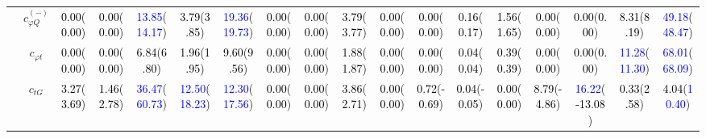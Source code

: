 \documentclass{article}
\begin{document}
\begin{landscape}
\begin{table}[H]
\begin{tabular}{|c|c|c|c|c|c|c|c|c|c|c|c|c|c|c|c|c|c|}
 & $c_{\varphi Q}^{(-)}$ & \textcolor{black}{0.00}(\textcolor{black}{0.00}) & \textcolor{black}{0.00}(\textcolor{black}{0.00}) & \textcolor{blue}{13.85}(\textcolor{blue}{14.17}) & \textcolor{black}{3.79}(\textcolor{black}{3.85}) & \textcolor{blue}{19.36}(\textcolor{blue}{19.73}) & \textcolor{black}{0.00}(\textcolor{black}{0.00}) & \textcolor{black}{0.00}(\textcolor{black}{0.00}) & \textcolor{black}{3.79}(\textcolor{black}{3.77}) & \textcolor{black}{0.00}(\textcolor{black}{0.00}) & \textcolor{black}{0.00}(\textcolor{black}{0.00}) & \textcolor{black}{0.16}(\textcolor{black}{0.17}) & \textcolor{black}{1.56}(\textcolor{black}{1.65}) & \textcolor{black}{0.00}(\textcolor{black}{0.00}) & \textcolor{black}{0.00}(\textcolor{black}{0.00}) & \textcolor{black}{8.31}(\textcolor{black}{8.19}) & \textcolor{blue}{49.18}(\textcolor{blue}{48.47})\\ \cline{2-18}
 & $c_{\varphi t}$ & \textcolor{black}{0.00}(\textcolor{black}{0.00}) & \textcolor{black}{0.00}(\textcolor{black}{0.00}) & \textcolor{black}{6.84}(\textcolor{black}{6.80}) & \textcolor{black}{1.96}(\textcolor{black}{1.95}) & \textcolor{black}{9.60}(\textcolor{black}{9.56}) & \textcolor{black}{0.00}(\textcolor{black}{0.00}) & \textcolor{black}{0.00}(\textcolor{black}{0.00}) & \textcolor{black}{1.88}(\textcolor{black}{1.87}) & \textcolor{black}{0.00}(\textcolor{black}{0.00}) & \textcolor{black}{0.00}(\textcolor{black}{0.00}) & \textcolor{black}{0.04}(\textcolor{black}{0.04}) & \textcolor{black}{0.39}(\textcolor{black}{0.39}) & \textcolor{black}{0.00}(\textcolor{black}{0.00}) & \textcolor{black}{0.00}(\textcolor{black}{0.00}) & \textcolor{blue}{11.28}(\textcolor{blue}{11.30}) & \textcolor{blue}{68.01}(\textcolor{blue}{68.09})\\ \cline{2-18}
 & $c_{tG}$ & \textcolor{black}{3.27}(\textcolor{black}{3.69}) & \textcolor{black}{1.46}(\textcolor{black}{2.78}) & \textcolor{blue}{36.47}(\textcolor{blue}{60.73}) & \textcolor{blue}{12.50}(\textcolor{blue}{18.23}) & \textcolor{blue}{12.30}(\textcolor{blue}{17.56}) & \textcolor{black}{0.00}(\textcolor{black}{0.00}) & \textcolor{black}{0.00}(\textcolor{black}{0.00}) & \textcolor{black}{3.86}(\textcolor{black}{2.71}) & \textcolor{black}{0.00}(\textcolor{black}{0.00}) & \textcolor{black}{0.72}(\textcolor{black}{-0.69}) & \textcolor{black}{0.04}(\textcolor{black}{-0.05}) & \textcolor{black}{0.00}(\textcolor{black}{0.00}) & \textcolor{black}{8.79}(\textcolor{black}{-4.86}) & \textcolor{blue}{16.22}(\textcolor{black}{-13.08}) & \textcolor{black}{0.33}(\textcolor{black}{2.58}) & \textcolor{black}{4.04}(\textcolor{blue}{10.40})\\ \cline{2-18}

\end{tabular}
\end{table}
\end{landscape}
\end{document}
